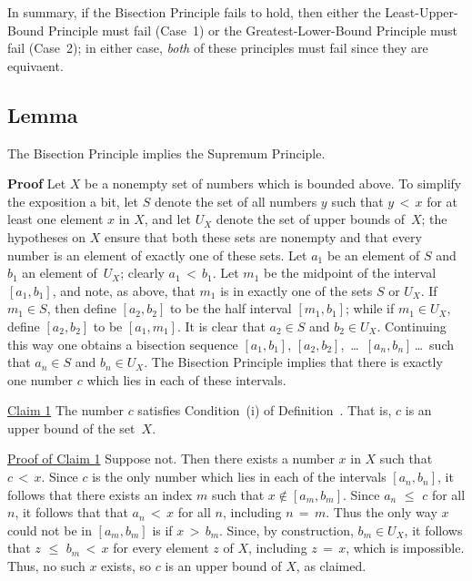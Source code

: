         In summary, if the Bisection Principle fails to hold, then either the Least-Upper-Bound Principle must fail (Case~1)
    or the Greatest-Lower-Bound Principle must fail (Case~2); in either case, {\em both} of these principles must fail since they are equivaent.

\V

            \subsection{\small{Lemma}}
            \label{LemmaB30.08CCCC}

\V

        The Bisection Principle implies the Supremum Principle.

\V

        {\bf Proof} Let $X$ be a nonempty set of numbers which is bounded above.
    To simplify the exposition a bit, let $S$ denote the set of all numbers $y$ such that $y\,<\,x$ for at least one element $x$ in $X$,
    and let $U_{X}$ denote the set of upper bounds of~$X$; the hypotheses on $X$ ensure that
    both these sets are nonempty and that every number is an element of exactly one of these sets.
    Let $a_{1}$ be an element of $S$ and $b_{1}$ an element of~$U_{X}$; clearly $a_{1}\,<\,b_{1}$.
    Let $m_{1}$ be the midpoint of the interval $[a_{1},b_{1}]$, and note, as above, that $m_{1}$ is in exactly one of the sets $S$ or $U_{X}$.
    If $m_{1}{\in}S$, then define $[a_{2},b_{2}]$ to be the half interval $[m_{1},b_{1}]$;
    while if $m_{1}{\in}U_{X}$, define $[a_{2},b_{2}]$ to be $[a_{1},m_{1}]$. It is clear that $a_{2}{\in}S$ and $b_{2}{\in}U_{X}$.
    Continuing this way one obtains a bisection sequence $[a_{1},b_{1}]$, $[a_{2},b_{2}]$, \,{\ldots}\, $[a_{n},b_{n}]$\,{\ldots}\, such that $a_{n}{\in}S$ and $b_{n}{\in}U_{X}$.
    The Bisection Principle implies that there is exactly one number $c$ which lies in each of these intervals.

        \underline{Claim 1} The number $c$ satisfies Condition~(i) of Definition~. That is, $c$ is an upper bound of the set~$X$.

        \underline{Proof of Claim 1} Suppose not. Then there exists a number $x$ in $X$ such that $c\,<\,x$.
    Since $c$ is the only number which lies in each of the intervals $[a_{n},b_{n}]$,
    it follows that there exists an index $m$ such that $x \not \in [a_{m}, b_{m}]$.
    Since $a_{n}\,\,{\leq}\,\,c$ for all $n$, it follows that that $a_{n}\,<\,x$ for all $n$, including $n \,=\, m$.
    Thus the only way $x$ could not be in $[a_{m}, b_{m}]$ is if $x\,>\,b_{m}$.
    Since, by construction, $b_{m}{\in}U_{X}$, it follows that $z\,\,{\leq}\,\,b_{m}\,<\,x$
    for every element $z$ of $X$, including $z \,=\, x$, which is impossible. Thus, no such $x$ exists, so $c$ is an upper bound of $X$, as claimed.

